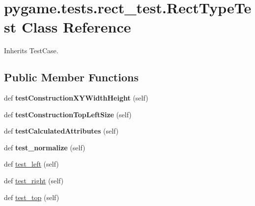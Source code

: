 \hypertarget{classpygame_1_1tests_1_1rect__test_1_1_rect_type_test}{}\section{pygame.\+tests.\+rect\+\_\+test.\+Rect\+Type\+Test Class Reference}
\label{classpygame_1_1tests_1_1rect__test_1_1_rect_type_test}


Inherits Test\+Case.

\subsection*{Public Member Functions}
\begin{DoxyCompactItemize}
\item 
\mbox{\label{classpygame_1_1tests_1_1rect__test_1_1_rect_type_test_a43cd8f073ee42b2d70511120257a7f32}} 
def {\bfseries test\+Construction\+X\+Y\+Width\+Height} (self)
\item 
\mbox{\label{classpygame_1_1tests_1_1rect__test_1_1_rect_type_test_a7929528ae7c32fde0216625a71e9d8a2}} 
def {\bfseries test\+Construction\+Top\+Left\+Size} (self)
\item 
\mbox{\label{classpygame_1_1tests_1_1rect__test_1_1_rect_type_test_a37f141cd7ca9275d67dfc0e97eb33607}} 
def {\bfseries test\+Calculated\+Attributes} (self)
\item 
\mbox{\label{classpygame_1_1tests_1_1rect__test_1_1_rect_type_test_aa2c63dfeba8b24b70dba33842c7db7b1}} 
def {\bfseries test\+\_\+normalize} (self)
\item 
def \hyperlink{classpygame_1_1tests_1_1rect__test_1_1_rect_type_test_a6d0a172591978c57cb0ba538177587ec}{test\+\_\+left} (self)
\item 
def \hyperlink{classpygame_1_1tests_1_1rect__test_1_1_rect_type_test_a2605f30b8e532d3a4c994ce9b868cbc9}{test\+\_\+right} (self)
\item 
def \hyperlink{classpygame_1_1tests_1_1rect__test_1_1_rect_type_test_afa912eb9dffeb0f0e75e6f6e4cd9ac20}{test\+\_\+top} (self)
\item 

\end{DoxyCompactItemize}
